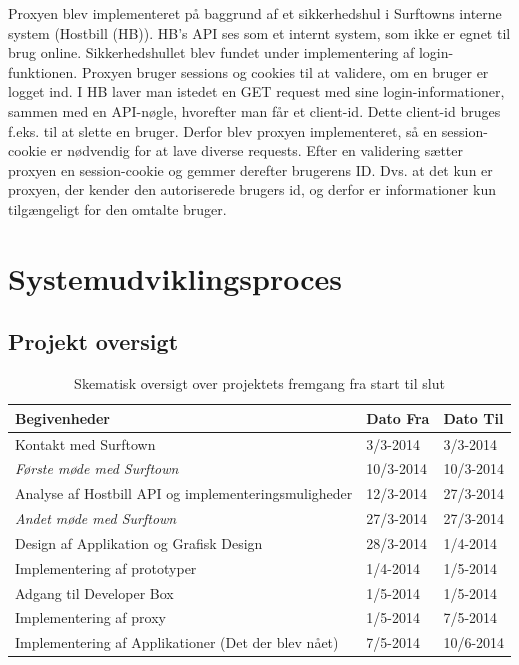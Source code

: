 \documentclass[12pt]{article}
\begin{document}
Proxyen blev implementeret på baggrund af et sikkerhedshul i Surftowns interne system (Hostbill (HB)). HB's API ses som et internt system, som ikke er egnet til brug online. Sikkerhedshullet blev fundet under implementering af login-funktionen. Proxyen bruger sessions og cookies til at validere, om en bruger er logget ind. I HB laver man istedet en GET request med sine login-informationer, sammen med en API-nøgle, hvorefter man får et client-id. Dette client-id bruges f.eks. til at slette en bruger. Derfor blev proxyen implementeret, så en session-cookie er nødvendig for at lave diverse requests. Efter en validering sætter proxyen en session-cookie og gemmer derefter brugerens ID. Dvs. at det kun er proxyen, der kender den autoriserede brugers id, og derfor er informationer kun tilgængeligt for den omtalte bruger.

\newpage
\section{Systemudviklingsproces}

\subsection{Projekt oversigt}

\begin{table}[h]
    \begin{tabular}{|l |l |l|}
	\hline
    \textbf{Begivenheder} & \textbf{Dato Fra} & \textbf{Dato Til}   \\
	\hline
    Kontakt med Surftown  & 3/3-2014 & 3/3-2014 \\
	\hline
    \emph{Første møde med Surftown} & 10/3-2014 & 10/3-2014 \\
	\hline
    Analyse af Hostbill API og implementeringsmuligheder & 12/3-2014 & 27/3-2014 \\
	\hline
  \emph{Andet møde med Surftown} & 27/3-2014 & 27/3-2014 \\
	\hline
    Design af Applikation og Grafisk Design & 28/3-2014 & 1/4-2014  \\
	\hline
    Implementering af prototyper  & 1/4-2014  & 1/5-2014  \\
	\hline
    Adgang til Developer Box & 1/5-2014  & 1/5-2014  \\
	\hline
    Implementering af proxy  & 1/5-2014  & 7/5-2014  \\
	\hline
    Implementering af Applikationer (Det der blev nået) & 7/5-2014  & 10/6-2014 \\
	\hline
    \end{tabular}
\caption{Skematisk oversigt over projektets fremgang fra start til slut}
\end{table}
\end{document}
